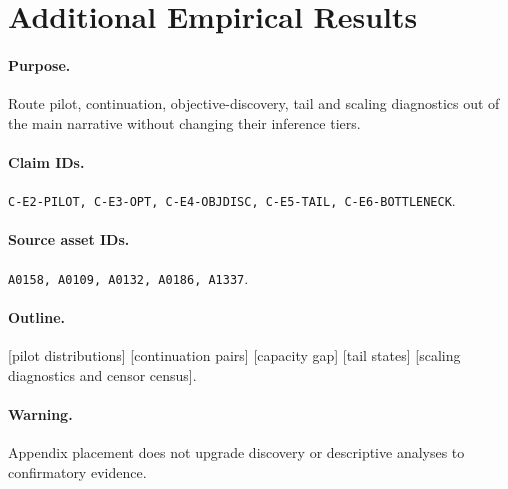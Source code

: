 \section{Additional Empirical Results}

\paragraph{Purpose.}
Route pilot, continuation, objective-discovery, tail and scaling diagnostics out
of the main narrative without changing their inference tiers.

\paragraph{Claim IDs.}
\texttt{C-E2-PILOT, C-E3-OPT, C-E4-OBJDISC, C-E5-TAIL,
C-E6-BOTTLENECK}.

\paragraph{Source asset IDs.}
\texttt{A0158, A0109, A0132, A0186, A1337}.

\paragraph{Outline.}
[pilot distributions] [continuation pairs] [capacity gap] [tail states]
[scaling diagnostics and censor census].

\paragraph{Warning.}
Appendix placement does not upgrade discovery or descriptive analyses to
confirmatory evidence.
